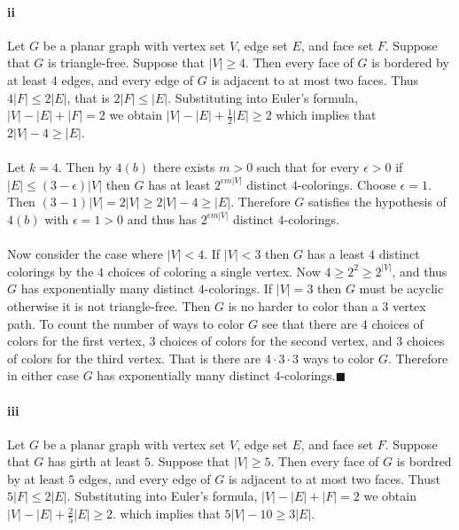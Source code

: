 \documentclass[letterpaper,12pt,oneside,onecolumn]{report}
\begin{document}
\paragraph{ii}
Let $G$ be a planar graph with vertex set $V$, edge set $E$, and face set $F$. Suppose that $G$ is triangle-free. Suppose that $|V| \geq 4$. Then every face of $G$ is bordered by at least $4$ edges, and every edge of $G$ is adjacent to at most two faces. Thus $4|F| \leq 2|E|$, that is $2|F| \leq |E|$. Substituting into Euler's formula, $|V| - |E| + |F| = 2$ we obtain $|V| - |E| + \frac{1}{2} |E| \geq 2$ which implies that $2|V| - 4 \geq |E|$.
\paragraph{}
Let $k = 4$. Then by $4(b)$ there exists $m > 0$ such that for every $\epsilon > 0 $ if $|E| \leq (3 - \epsilon)|V|$ then $G$ has at least $2^{\epsilon m |V|}$ distinct $4$-colorings. Choose $\epsilon = 1$. Then $(3 - 1)|V| = 2|V| \geq 2|V| - 4 \geq |E|$. Therefore $G$ satisfies the hypothesis of $4(b)$ with $\epsilon = 1 > 0$ and thus has $2^{\epsilon m |V|}$ distinct $4$-colorings.
\paragraph{}
Now consider the case where $|V| < 4$. If $|V| < 3$ then $G$ has a least $4$ distinct colorings by the $4$ choices of coloring a single vertex. Now $4 \geq 2^2 \geq 2^{|V|}$, and thus $G$ has exponentially many distinct $4$-colorings. If $|V| = 3$ then $G$ must be acyclic otherwise it is not triangle-free. Then $G$ is no harder to color than a $3$ vertex path. To count the number of ways to color $G$ see that there are $4$ choices of colors for the first vertex, $3$ choices of colors for the second vertex, and $3$ choices of colors for the third vertex. That is there are $4\cdot 3 \cdot 3$ ways to color $G$. Therefore in either case $G$ has exponentially many distinct $4$-colorings.$\blacksquare$
\paragraph{iii}
Let $G$ be a planar graph with vertex set $V$, edge set $E$, and face set $F$. Suppose that $G$ has girth at least $5$. Suppose that $|V| \geq 5$. Then every face of $G$ is bordred by at least $5$ edges, and every edge of $G$ is adjacent to at most two faces. Thust $5|F| \leq 2|E|$. Substituting into Euler's formula, $|V| - |E| + |F| = 2$ we obtain $|V| - |E| + \frac{2}{5}|E| \geq 2$. which implies that $5|V| - 10 \geq 3|E|$. 
\end{document}

